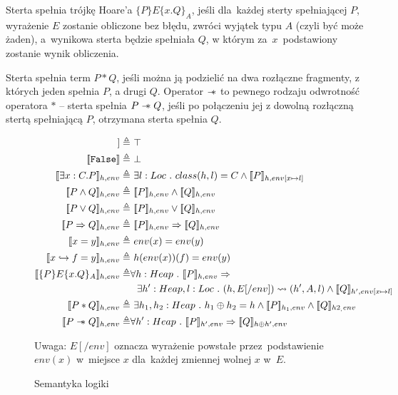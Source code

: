 \documentclass[]{pracamgr}
\newcommand \wand {\mathrel{-\mkern-6mu*}}
\newcommand \hoare [5] {\{#1\}#2\{#4.#5\}_#3}
\renewcommand \| {\hspace{0.75em} | \hspace{0.75em} }
\renewcommand \[ {[\![}
\renewcommand \] {]\!]}
\theoremstyle{definition}
\begin{document}
Sterta spełnia trójkę Hoare'a $\hoare{P}{E}{A}{x}{Q}$, jeśli dla~każdej sterty spełniającej
$P$, wyrażenie $E$ zostanie obliczone bez błędu, zwróci wyjątek typu $A$ (czyli być może żaden),
a~wynikowa sterta będzie
spełniała $Q$, w którym za~$x$~podstawiony zostanie wynik obliczenia.

Sterta spełnia term $P * Q$, jeśli można ją podzielić na dwa rozłączne fragmenty, z których
jeden spełnia $P$, a drugi $Q$.
Operator $\wand$ to pewnego rodzaju odwrotność operatora $*$ -- sterta spełnia $P \wand Q$, jeśli
po połączeniu jej z dowolną rozłączną stertą spełniającą $P$, otrzymana sterta spełnia $Q$.

\begin{figure}
\begin{align*}
 \[ \texttt{True} \] \triangleq & \ \top \\
 \[ \texttt{False} \] \triangleq & \ \bot \\
 \[ \exists x : C . P \]_{h, env} \triangleq & \ \exists l : Loc\ .\ class(h, l) = C \wedge
    \[ P \]_{h, env[x \mapsto l]}  \\
 \[ P \wedge Q \]_{h, env} \triangleq & \ \[ P \]_{h, env} \wedge \[ Q \]_{h, env} \\
 \[ P \vee Q \]_{h, env} \triangleq & \ \[ P \]_{h, env} \vee \[ Q \]_{h, env} \\
 \[ P \Rightarrow Q \]_{h, env} \triangleq & \ \[ P \]_{h, env} \Rightarrow \[ Q \]_{h, env} \\
 \[ x = y \]_{h, env} \triangleq & \ env(x) = env(y) \\
 \[ x \hookrightarrow f = y \]_{h, env} \triangleq & \ h(env(x))(f) = env(y) \\
 \[ \hoare{P}{E}{A}{x}{Q} \]_{h, env} \triangleq & \forall h : Heap \ . \ \[ P \]_{h, env} \Rightarrow \\
      & \ \  \exists h' : Heap, l : Loc \ . \ (h, E[/env]) \leadsto (h', A, l) \wedge
      \[ Q \]_{h', env[x \mapsto l]}  \\
 \[ P * Q \]_{h, env} \triangleq & \ \exists h_1,h_2 : Heap\ .\ h_1 \oplus h_2 = h \wedge
    \[ P \]_{h_1, env} \wedge \[ Q \]_{h2_, env}  \\
 \[ P \wand Q \]_{h, env} \triangleq & \forall h' : Heap \ . \ \[ P \]_{h', env} \Rightarrow \[ Q \]_{h \oplus h', env}
\end{align*}

Uwaga: $E[/env]$ oznacza wyrażenie powstałe przez~podstawienie $env(x)$ w~miejsce $x$ dla~każdej zmiennej
wolnej $x$ w~$E$.

\caption{Semantyka logiki}
\label{fig:sematics}
\end{figure}
\end{document}
